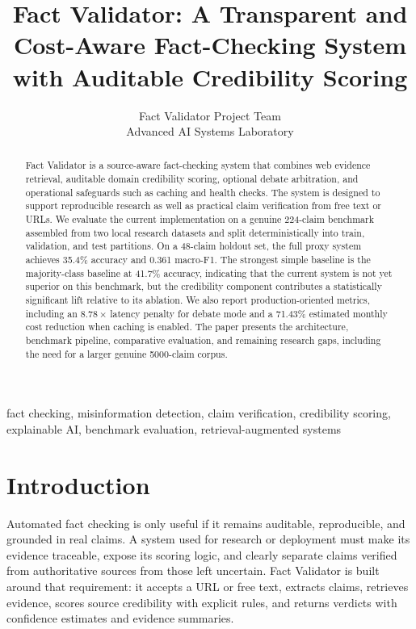\documentclass[conference]{IEEEtran}
\title{Fact Validator: A Transparent and Cost-Aware Fact-Checking System with Auditable Credibility Scoring}
\author{Fact Validator Project Team\\Advanced AI Systems Laboratory}
\begin{document}
\maketitle

\begin{abstract}
Fact Validator is a source-aware fact-checking system that combines web evidence retrieval, auditable domain credibility scoring, optional debate arbitration, and operational safeguards such as caching and health checks. The system is designed to support reproducible research as well as practical claim verification from free text or URLs. We evaluate the current implementation on a genuine 224-claim benchmark assembled from two local research datasets and split deterministically into train, validation, and test partitions. On a 48-claim holdout set, the full proxy system achieves 35.4\% accuracy and 0.361 macro-F1. The strongest simple baseline is the majority-class baseline at 41.7\% accuracy, indicating that the current system is not yet superior on this benchmark, but the credibility component contributes a statistically significant lift relative to its ablation. We also report production-oriented metrics, including an 8.78\,$\times$ latency penalty for debate mode and a 71.43\% estimated monthly cost reduction when caching is enabled. The paper presents the architecture, benchmark pipeline, comparative evaluation, and remaining research gaps, including the need for a larger genuine 5000-claim corpus.
\end{abstract}

\begin{IEEEkeywords}
fact checking, misinformation detection, claim verification, credibility scoring, explainable AI, benchmark evaluation, retrieval-augmented systems
\end{IEEEkeywords}

\section{Introduction}
Automated fact checking is only useful if it remains auditable, reproducible, and grounded in real claims. A system used for research or deployment must make its evidence traceable, expose its scoring logic, and clearly separate claims verified from authoritative sources from those left uncertain. Fact Validator is built around that requirement: it accepts a URL or free text, extracts claims, retrieves evidence, scores source credibility with explicit rules, and returns verdicts with confidence estimates and evidence summaries.
\end{document}
